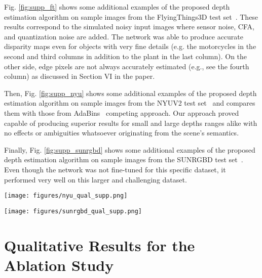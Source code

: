 \documentclass[preprint,5p,twocolumn]{elsarticle}
\begin{document}
Fig. \ref{fig:supp_ft} shows some additional examples of the proposed depth estimation algorithm on  sample images from the  FlyingThings3D test set~\cite{MIFDB16}. These results correspond to the simulated noisy input images where sensor noise, CFA, and quantization noise are added. The network was able to produce accurate disparity maps even for objects with very fine details (e.g. the motorcycles in the second and third columns in addition to the plant in the last column). On the other side, edge pixels are not always accurately estimated (e.g., see the fourth column) as discussed in Section VI in the paper.

Then, Fig. \ref{fig:supp_nyu} shows some additional examples of the proposed depth estimation algorithm on  sample images from the NYUV2 test set~\cite{eigen2015predicting} and compares them with those from AdaBins~\cite{bhat2020adabins} competing approach. Our approach proved capable of producing superior results for small and large depths ranges alike with no effects or ambiguities whatsoever originating from the scene's semantics.  

Finally, Fig. \ref{fig:supp_sunrgbd} shows some additional examples of the proposed depth estimation  algorithm on sample images from the SUNRGBD test set~\cite{song2015sun}. Even though the network was not fine-tuned for this specific dataset, it performed very well on this larger  and challenging dataset. 





\begin{figure*}[h!]
\centering
\texttt{[image: figures/nyu\_qual\_supp.png]}
\caption{Additional qualitative results from the proposed approach as well as those from AdaBins~\cite{bhat2020adabins} on the test set of NYUV2~\cite{eigen2015predicting}.}
\label{fig:supp_nyu}
\end{figure*}



\begin{figure*}[h!]
\centering
\texttt{[image: figures/sunrgbd\_qual\_supp.png]}
\caption{Additional qualitative results from our proposed method on the test set of SUNRGBD~\cite{song2015sun}}
\label{fig:supp_sunrgbd}
\end{figure*}

\section{Qualitative Results for the Ablation Study}
\label{sec:abl}
\end{document}
